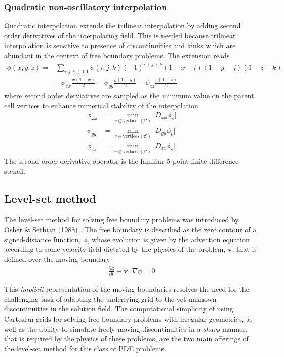 \documentclass{elsarticle}
\begin{document}
\subsubsection{Quadratic non-oscillatory interpolation}
Quadratic interpolation extends the trilinear interpolation by adding second order derivatives of the interpolating field. This is needed because trilinear interpolation is sensitive to presence of discontinuities and kinks which are abundant in the context of free boundary problems. The extension reads
\begin{align*}
	\phi(x,y,z)= &\sum_{i,j,k\in {0,1}} \phi(i,j,k) (-1)^{i+j+k}(1-x-i)(1-y-j)(1-z-k) \\
				& - \phi_{xx} \frac{x(1-x)}{2} - \phi_{yy} \frac{y(1-y)}{2}- \phi_{zz} \frac{z(1-z)}{2} 
\end{align*}
where second order derviatives are sampled as the minimum value on the parent cell vertices to enhance numerical stability of the interpolation
\begin{align*}
	\phi_{xx} & = \min_{v \in \textrm{vertices}(\mathcal{C})} \vert D_{xx} \phi_v \vert \\
	\phi_{yy} & = \min_{v \in \textrm{vertices}(\mathcal{C})} \vert D_{yy} \phi_v \vert \\
	\phi_{zz} & = \min_{v \in \textrm{vertices}(\mathcal{C})} \vert D_{zz} \phi_v \vert
\end{align*}
The second order derivative operator is the familiar 5-point finite difference stencil.




\subsection{Level-set method}
The level-set method for solving free boundary problems was introduced by Osher \& Sethian (1988) \cite{osher1988fronts}. The free boundary is described as the zero contour of a signed-distance function, $\phi$, whose evolution is given by the advection equation according to some velocity field dictated by the physics of the problem, $\mathbf{v}$, that is defined over the moving boundary
\begin{align}
	\frac{\partial \phi}{\partial t} + \mathbf{v}\cdot \nabla \phi = 0
\end{align}

This \textit{implicit} representation of the moving boundaries resolves the need for the challenging task of adapting the underlying grid to the yet-unknown discontinuities in the solution field. The computational simplicity of using Cartesian grids for solving free boundary problems with irregular geometries, as well as the ability to simulate freely moving discontinuities in a \textit{sharp}-manner, that is required by the physics of these problems, are the two main offerings of the level-set method for this class of PDE problems.
\end{document}
